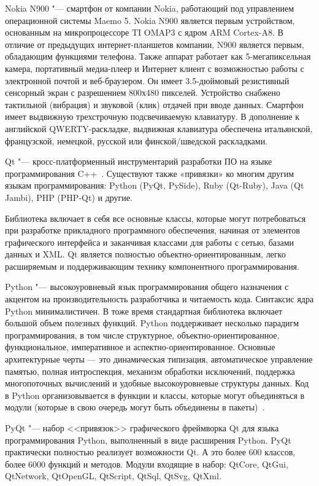 Nokia N900 "--- смартфон от компании Nokia, работающий под управлением операционной системы Maemo 5.
Nokia N900 является первым устройством, основанным на микропроцессоре TI OMAP3 с ядром ARM Cortex-A8.
В отличие от предыдущих интернет-планшетов компании, N900 является первым, обладающим функциями телефона.
Также аппарат работает как 5-мегапиксельная камера, портативный медиа-плеер и Интернет клиент с возможностью работы с электронной почтой и веб-браузером.
Он имеет 3.5-дюймовый резистивный сенсорный экран с разрешением 800х480 пикселей. Устройство снабжено тактильной (вибрация) и звуковой (клик) отдачей при вводе данных.
Смартфон имеет выдвижную трехстрочную подсвечиваемую клавиатуру.
В дополнение к английской QWERTY-раскладке, выдвижная клавиатура обеспечена итальянской, французской, немецкой, русской или финской/шведской раскладками.

Qt "--- кросс-платформенный инструментарий разработки ПО на языке программирования C++~\cite{qt_4, qt_4_with_examples}.
Существуют также «привязки» ко многим другим языкам программирования: Python (PyQt, PySide), Ruby (Qt-Ruby), Java (Qt Jambi), PHP (PHP-Qt) и другие.

Библиотека включает в себя все основные классы, которые могут потребоваться при разработке прикладного программного обеспечения, начиная от элементов графического интерфейса и заканчивая классами для работы с сетью, базами данных и XML. Qt является полностью объектно-ориентированным, легко расширяемым и поддерживающим технику компонентного программирования.

Python "--- высокоуровневый язык программирования общего назначения с акцентом на производительность разработчика и читаемость кода. Синтаксис ядра Python минималистичен. В тоже время стандартная библиотека включает большой объем полезных функций. Python поддерживает несколько парадигм программирования, в том числе структурное, объектно-ориентированное, функциональное, императивное и аспектно-ориентированное. Основные архитектурные черты --- это динамическая типизация, автоматическое управление памятью, полная интроспекция, механизм обработки исключений, поддержка многопоточных вычислений и удобные высокоуровневые структуры данных. Код в Python организовывается в функции и классы, которые могут объединяться в модули (которые в свою очередь могут быть объединены в пакеты)~\cite{python}.

PyQt "--- набор <<привязок>> графического фреймворка Qt для языка программирования Python, выполненный в виде расширения Python. PyQt практически полностью реализует возможности Qt. А это более 600 классов, более 6000 функций и методов. Модули входящие в набор: QtCore,
QtGui, QtNetwork, QtOpenGL, QtScript, QtSql, QtSvg, QtXml.

